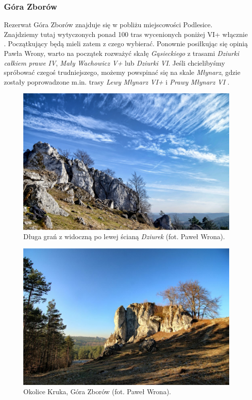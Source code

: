 \documentclass{article}
\begin{document}
\subsubsection{Góra Zborów}
Rezerwat Góra Zborów znajduje się w pobliżu miejscowości Podlesice. Znajdziemy tutaj wytyczonych ponad 100 tras wycenionych poniżej VI+ włącznie \cite{topo-gora-zborow}. Początkujący będą mieli zatem z czego wybierać. Ponownie posiłkując się opinią Pawła Wrony, warto na początek rozważyć skałę \textit{Gąsieckiego} z trasami \textit{Dziurki całkiem prawe IV}, \textit{Mały Wachowicz V+} lub \textit{Dziurki VI}. Jeśli chcielibyśmy spróbować czegoś trudniejszego, możemy powspinać się na skale \textit{Młynarz}, gdzie zostały poprowadzone m.in. trasy \textit{Lewy Młynarz VI+} i \textit{Prawy Młynarz VI} \cite{jura-gora-zborow}.

\begin{figure}[!htbp]
	\begin{center}
		\includegraphics[width=0.9\linewidth]{images/jura-gora-zborow.eps}
	\end{center}
	\caption{Długa grań z widoczną po lewej ścianą \textit{Dziurek} (fot. Paweł Wrona)\cite{jura-gora-zborow}.}
	\label{zborow}
\end{figure}

\begin{figure}[!htbp]
	\begin{center}
		\includegraphics[width=0.9\linewidth]{images/jura-gora-zborow-2.eps}
	\end{center}
	\caption{Okolice Kruka, Góra Zborów (fot. Paweł Wrona)\cite{jura-gora-zborow}.}
	\label{}
\end{figure}
\end{document}
